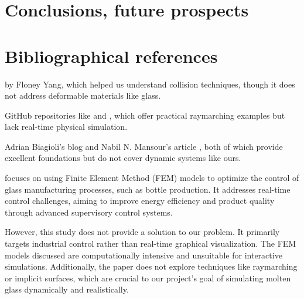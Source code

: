 \documentclass{rapportcs}
\begin{document}
    \newpage
    \section{Conclusions, future prospects}

    \newpage
    \section{Bibliographical references}
   \cite{yang_raymarching_2024} by Floney Yang, which helped us understand collision techniques, though it does not address deformable materials like glass.

    GitHub repositories like \cite{hecomi_raymarching_2024} and \cite{koskimies_raymarching_2024}, which offer practical raymarching examples but lack real-time physical simulation.

    Adrian Biagioli's blog \cite{biagioli_raymarching_2024} and Nabil N. Mansour's article \cite{mansour_sdf_2024}, both of which provide excellent foundations but do not cover dynamic systems like ours.

    \cite{grega2015modelling} focuses on using Finite Element Method (FEM) models to optimize the control of glass manufacturing processes, such as bottle production. It addresses real-time control challenges, aiming to improve energy efficiency and product quality through advanced supervisory control systems.

    However, this study does not provide a solution to our problem. It primarily targets industrial control rather than real-time graphical visualization. The FEM models discussed are computationally intensive and unsuitable for interactive simulations. Additionally, the paper does not explore techniques like raymarching or implicit surfaces, which are crucial to our project’s goal of simulating molten glass dynamically and realistically.

    \newpage

    \newpage
\end{document}
